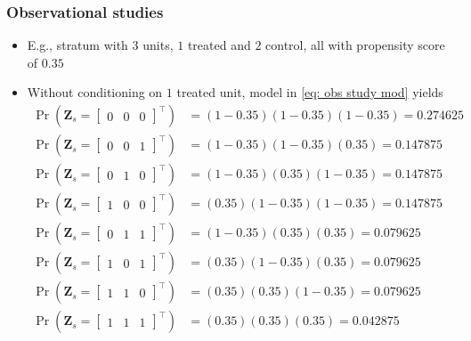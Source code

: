 \documentclass[table, xcolor = {dvipsnames}, 9pt]{beamer}
\theoremstyle{plain}
\begin{document}
\begin{frame}[t]
\frametitle{Observational studies}
\vfill
\begin{itemize} \vfill
\item E.g., stratum with $3$ units, $1$ treated and $2$ control, all with propensity score of $0.35$ \vfill
\item Without conditioning on $1$ treated unit, model in \eqref{eq: obs study mod} yields \vfill
\small
\begin{align*}
\Pr\left(\bm{Z}_s = \begin{bmatrix} 0 & 0 & 0 \end{bmatrix}^{\top}\right) & = (1 - 0.35) (1 - 0.35) (1 - 0.35) = 0.274625 \\
\Pr\left(\bm{Z}_s = \begin{bmatrix} 0 & 0 & 1 \end{bmatrix}^{\top}\right) & = (1 - 0.35) (1 - 0.35) (0.35) = 0.147875 \\
\Pr\left(\bm{Z}_s = \begin{bmatrix} 0 & 1 & 0 \end{bmatrix}^{\top}\right) & = (1 - 0.35) (0.35) (1 - 0.35) = 0.147875 \\
\Pr\left(\bm{Z}_s = \begin{bmatrix} 1 & 0 & 0 \end{bmatrix}^{\top}\right) & = (0.35) (1 - 0.35) (1 - 0.35) = 0.147875 \\
\Pr\left(\bm{Z}_s = \begin{bmatrix} 0 & 1 & 1 \end{bmatrix}^{\top}\right) & = (1 - 0.35) (0.35) (0.35) = 0.079625 \\
\Pr\left(\bm{Z}_s = \begin{bmatrix} 1 & 0 & 1 \end{bmatrix}^{\top}\right) & = (0.35) (1 - 0.35) (0.35) = 0.079625 \\
\Pr\left(\bm{Z}_s = \begin{bmatrix} 1 & 1 & 0 \end{bmatrix}^{\top}\right) & = (0.35) (0.35) (1 - 0.35) = 0.079625 \\
\Pr\left(\bm{Z}_s = \begin{bmatrix} 1 & 1 & 1 \end{bmatrix}^{\top}\right) & = (0.35) (0.35) (0.35) = 0.042875 \\
\end{align*}
\normalsize \vfill
\end{itemize} \vfill
\end{frame}
\end{document}

